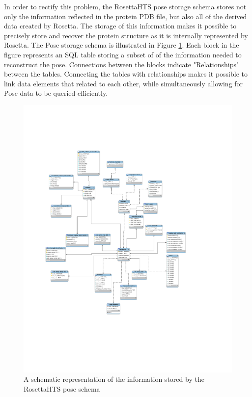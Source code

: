 In order to rectify this problem, the RosettaHTS pose storage schema stores not only the information reflected in the protein PDB file, but also all of the derived data created by Rosetta.
The storage of this information makes it possible to precisely store and recover the protein structure as it is internally represented by Rosetta.
The Pose storage schema is illustrated in Figure \ref{fig:pose_schema}.  Each block in the figure represents an SQL table storing a subset of 
of the information needed to reconstruct the pose.
Connections between the blocks indicate "Relationships" between the tables.  Connecting the tables with relationships makes it possible to link data elements that related to each other, while simultaneously allowing for Pose data to be queried efficiently.

\begin{figure}
\centering
\includegraphics[width=6in]{figures/mysql/mysql_model.pdf}
\caption{
A schematic representation of the information stored by the RosettaHTS pose schema
}
\label{fig:pose_schema}
\end{figure}


